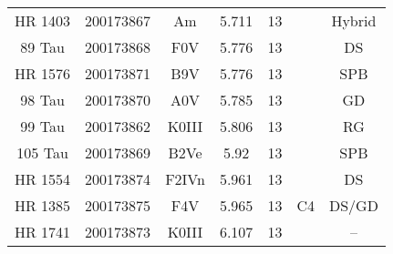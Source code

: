\begin{table*}
\begin{tabular}{ccccccc}
HR 1403 & 200173867 & Am & 5.711 & 13 &  & Hybrid \\
89 Tau & 200173868 & F0V & 5.776 & 13 &  & DS \\
HR 1576 & 200173871 & B9V & 5.776 & 13 &  & SPB \\
98 Tau & 200173870 & A0V & 5.785 & 13 &  & GD \\
99 Tau & 200173862 & K0III & 5.806 & 13 &  & RG \\
105 Tau & 200173869 & B2Ve & 5.92 & 13 &  & SPB \\
HR 1554 & 200173874 & F2IVn & 5.961 & 13 &  & DS \\
HR 1385 & 200173875 & F4V & 5.965 & 13 & C4 & DS/GD \\
HR 1741 & 200173873 & K0III & 6.107 & 13 &  & -- \\
\hline
\end{tabular}
\end{table*}
